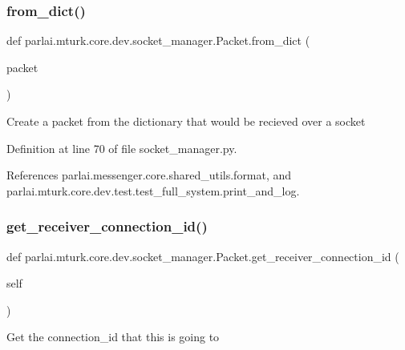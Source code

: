 \subsubsection{\texorpdfstring{from\+\_\+dict()}{from\_dict()}}
{\footnotesize\ttfamily def parlai.\+mturk.\+core.\+dev.\+socket\+\_\+manager.\+Packet.\+from\+\_\+dict (\begin{DoxyParamCaption}\item[{}]{packet }\end{DoxyParamCaption})\hspace{0.3cm}{\ttfamily [static]}}

\begin{DoxyVerb}Create a packet from the dictionary that would
be recieved over a socket
\end{DoxyVerb}
 

Definition at line 70 of file socket\+\_\+manager.\+py.



References parlai.\+messenger.\+core.\+shared\+\_\+utils.\+format, and parlai.\+mturk.\+core.\+dev.\+test.\+test\+\_\+full\+\_\+system.\+print\+\_\+and\+\_\+log.

\mbox{\label{classparlai_1_1mturk_1_1core_1_1dev_1_1socket__manager_1_1Packet_a2525f38d0e5c24c92f4c1aed80423a37}} 
\subsubsection{\texorpdfstring{get\+\_\+receiver\+\_\+connection\+\_\+id()}{get\_receiver\_connection\_id()}}
{\footnotesize\ttfamily def parlai.\+mturk.\+core.\+dev.\+socket\+\_\+manager.\+Packet.\+get\+\_\+receiver\+\_\+connection\+\_\+id (\begin{DoxyParamCaption}\item[{}]{self }\end{DoxyParamCaption})}

\begin{DoxyVerb}Get the connection_id that this is going to\end{DoxyVerb}
 

